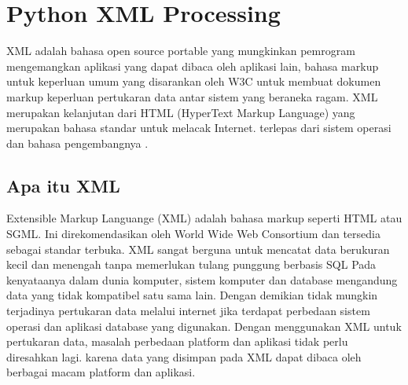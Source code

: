 

\section{Python XML Processing}
  XML adalah bahasa open source portable yang mungkinkan pemrogram mengemangkan aplikasi yang dapat dibaca oleh aplikasi lain, bahasa markup untuk keperluan umum yang disarankan oleh W3C untuk membuat dokumen markup keperluan pertukaran data antar sistem yang beraneka ragam. XML merupakan kelanjutan dari HTML (HyperText Markup Language) yang merupakan bahasa standar untuk melacak Internet.
terlepas dari sistem operasi dan bahasa pengembangnya .
\subsection{Apa itu XML}
  Extensible Markup Languange (XML) adalah bahasa markup seperti HTML atau SGML. 
Ini direkomendasikan oleh World Wide Web Consortium dan tersedia sebagai standar terbuka.
XML sangat berguna untuk mencatat data berukuran kecil dan menengah tanpa memerlukan tulang punggung berbasis SQL  
Pada kenyataanya dalam dunia komputer, sistem komputer dan database mengandung data yang tidak kompatibel satu sama lain. Dengan demikian tidak mungkin terjadinya pertukaran data melalui internet jika terdapat perbedaan sistem operasi dan aplikasi database yang digunakan.
Dengan menggunakan XML untuk pertukaran data, masalah perbedaan platform dan aplikasi tidak perlu diresahkan lagi. karena data yang disimpan pada XML dapat dibaca oleh berbagai macam platform dan aplikasi.

